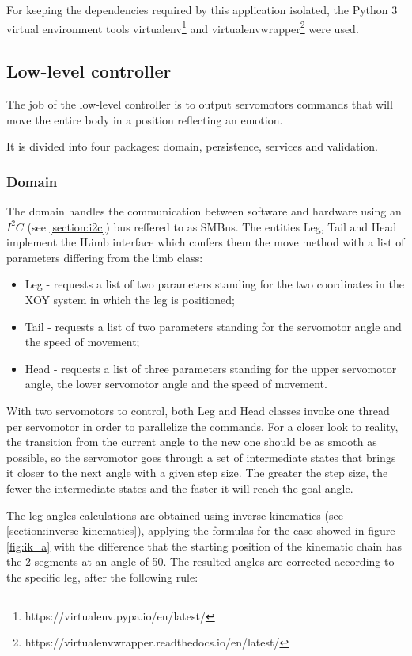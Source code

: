 \documentclass[runningheads,a4paper,12pt]{report}
\begin{document}
For keeping the dependencies required by this application isolated, the Python 3 virtual environment tools virtualenv\footnote{https://virtualenv.pypa.io/en/latest/} and virtualenvwrapper\footnote{https://virtualenvwrapper.readthedocs.io/en/latest/} were used. 

\subsection*{Low-level controller}
The job of the low-level controller is to output servomotors commands that will move the entire body in a position reflecting an emotion.

It is divided into four packages: domain, persistence, services and validation. 

\subsubsection{Domain}
The domain handles the communication between software and hardware using an $I^2C$ (see \ref{section:i2c}) bus reffered to as SMBus. The entities Leg, Tail and Head implement the ILimb interface which confers them the move method with a list of parameters differing from the limb class:
\begin{itemize}
\item Leg - requests a list of two parameters standing for the two coordinates in the XOY system in which the leg is positioned;
\item Tail - requests a list of two parameters standing for the servomotor angle and the speed of movement;
\item Head - requests a list of three parameters standing for the upper servomotor angle, the lower servomotor angle and the speed of movement.
\end{itemize}

With two servomotors to control, both Leg and Head classes invoke one thread per servomotor in order to parallelize the commands. For a closer look to reality, the transition from the current angle to the new one should be as smooth as possible, so the servomotor goes through a set of intermediate states that brings it closer to the next angle with a given step size. The greater the step size, the fewer the intermediate states  and the faster it will reach the goal angle. 

The leg angles calculations are obtained using inverse kinematics (see \ref{section:inverse-kinematics}), applying the formulas for the case showed in figure \ref{fig:ik_a} with the difference that the starting position of the kinematic chain has the 2 segments at an angle of 50\textdegree. The resulted angles are corrected according to the specific leg, after the following rule:
\end{document}
